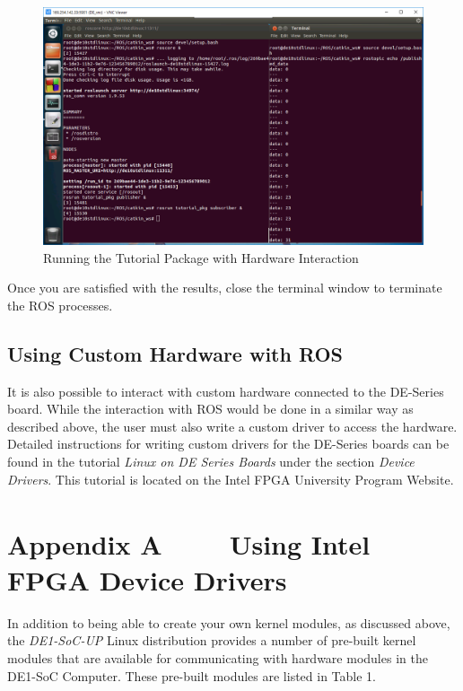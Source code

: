 \documentclass[11pt, twoside, pdftex]{article}
\begin{document}
\begin{figure}[H]
	\begin{center}
		\includegraphics[scale=0.55]{figures/rosrun_tutorial_pkg_2.png}
		\caption{Running the Tutorial Package with Hardware Interaction}
		\label{fig:rosruntutorialpkg2}
	\end{center}
\end{figure}
Once you are satisfied with the results, close the terminal window to terminate the ROS processes.
\subsection{Using Custom Hardware with ROS}
It is also possible to interact with custom hardware connected to the DE-Series board. While the interaction with ROS would be done in a similar way as described above, the user must also write a custom driver to access the hardware. Detailed instructions for writing custom drivers for the DE-Series boards can be found in the tutorial {\it Linux on DE Series Boards} under the section {\it Device Drivers}. This tutorial is located on the Intel FPGA University Program Website.


\newpage
\section*{Appendix A~~~~ Using Intel\textsuperscript{\textregistered} FPGA Device Drivers}

\noindent In addition to being able to create your own kernel modules, as 
discussed above, the \textit{DE1-SoC-UP} Linux distribution provides a number of pre-built
kernel modules that are available for communicating with hardware modules in the DE1-SoC 
Computer. These pre-built modules are listed in Table 1.
\end{document}
